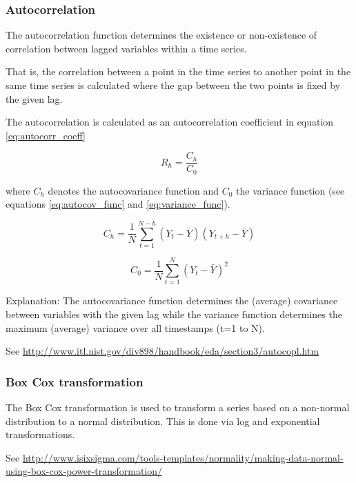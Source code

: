 \subsubsection{Autocorrelation}



The autocorrelation function determines the existence or non-existence of correlation between lagged variables within a time series. 

That is, the correlation between a point in the time series to another point in the same time series is calculated where the gap between the two points is fixed by the given lag. 

The autocorrelation is calculated as an autocorrelation coefficient in equation \ref{eq:autocorr_coeff}

\begin{equation}
R_h = \frac{C_h}{C_0}
\label{eq:autocorr_coeff}
\end{equation}


where $C_h$ denotes the autocovariance function and $C_0$ the variance function 
(see equations \ref{eq:autocov_func} and \ref{eq:variance_func}). 


\begin{equation}
C_h = \frac{1}{N} \sum\limits_{t=1}^{N-h} (Y_t - \bar{Y}) (Y_{t+h} - \bar{Y})
\label{eq:autocov_func}
\end{equation}


\begin{equation}
C_0 = \frac{1}{N} \sum\limits_{t=1}^{N} (Y_t - \bar{Y})^2
\label{eq:variance_func}
\end{equation}


Explanation: The autocovariance function determines the (average) covariance between variables with the given lag while the variance function determines the maximum (average) variance over all timestamps (t=1 to N). 


See \url{http://www.itl.nist.gov/div898/handbook/eda/section3/autocopl.htm}


\subsubsection{Box Cox transformation}

The Box Cox transformation is used to transform a series based on a non-normal distribution to a normal distribution. This is done via log and exponential transformations. 

See \url{http://www.isixsigma.com/tools-templates/normality/making-data-normal-using-box-cox-power-transformation/}



